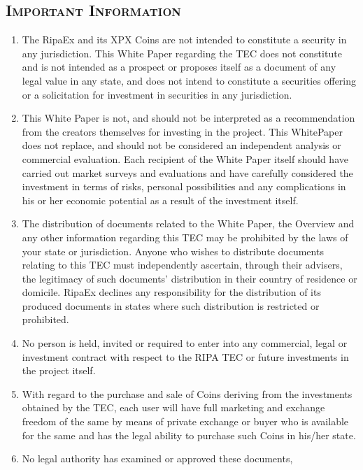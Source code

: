 \documentclass[11pt,fleqn,oneside]{book} %
\begin{document}
\begin{scriptsize}
{		\section{\textsc{Important Information}}
		\begin{enumerate}
			\item The RipaEx and its XPX Coins are not intended to constitute
			a security in any jurisdiction.
			This White Paper regarding the TEC does not constitute
			and is not intended as a prospect or proposes itself
			as a document of any legal value in any state, and does
			not intend to constitute a securities offering or a
			solicitation for investment in securities in any jurisdiction.
			\item This White Paper is not, and should not be interpreted as a
			recommendation from the creators themselves for investing
			in the project. This WhitePaper does not replace, and
			should not be considered an independent analysis or commercial
			evaluation. Each recipient of the White Paper itself
			should have carried out market surveys and evaluations
			and have carefully considered the investment in terms of
			risks, personal possibilities and any complications in his or
			her economic potential as a result of the investment itself.
			\item The distribution of documents related to the White Paper,
			the Overview and any other information regarding this TEC
			may be prohibited by the laws of your state or jurisdiction.
			Anyone who wishes to distribute documents relating to this 
			TEC must independently ascertain, through their
			advisers, the legitimacy of such documents’ distribution
			in their country of residence or domicile. RipaEx declines
			any responsibility for the distribution of its produced
			documents in states where such distribution is restricted
			or prohibited.
			\item No person is held, invited or required to enter into any
			commercial, legal or investment contract with respect to
			the RIPA TEC or future investments in the project itself.
			\item With regard to the purchase and sale of Coins deriving
			from the investments obtained by the TEC, each user will
			have full marketing and exchange freedom of the same by
			means of private exchange or buyer who is available for
			the same and has the legal ability to purchase such Coins
			in his/her state.
			\item No legal authority has examined or approved these documents,

\end{enumerate}}
\end{scriptsize}
\end{document}
